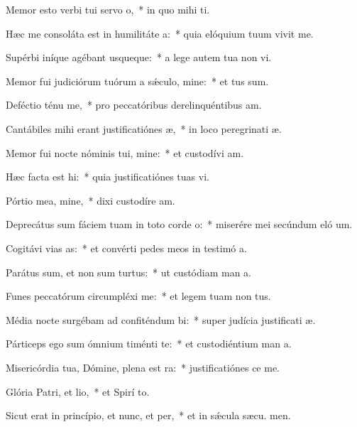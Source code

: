 \item Memor esto verbi tui servo o,~* in quo mihi  ti.
\item Hæc me consoláta est in humilitáte a:~* quia elóquium tuum vivit me.
\item Supérbi iníque agébant usqueque:~* a lege autem tua non vi.
\item Memor fui judiciórum tuórum a sǽculo, mine:~* et tus sum.
\item Deféctio ténu me,~* pro peccatóribus derelinquéntibus  am.
\item Cantábiles mihi erant justificatiónes æ,~* in loco peregrinati æ.
\item Memor fui nocte nóminis tui, mine:~* et custodívi  am.
\item Hæc facta est hi:~* quia justificatiónes tuas vi.
\item Pórtio mea, mine,~* dixi custodíre  am.
\item Deprecátus sum fáciem tuam in toto corde o:~* miserére mei secúndum eló um.
\item Cogitávi vias as:~* et convérti pedes meos in testimó a.
\item Parátus sum, et non sum turtus:~* ut custódiam man a.
\item Funes peccatórum circumpléxi  me:~* et legem tuam non  tus.
\item Média nocte surgébam ad confiténdum bi:~* super judícia justificati æ.
\item Párticeps ego sum ómnium timénti te:~* et custodiéntium man a.
\item Misericórdia tua, Dómine, plena est ra:~* justificatiónes  ce me.
\item Glória Patri, et lio,~* et Spirí to.
\item Sicut erat in princípio, et nunc, et per,~* et in sǽcula sæcu. men.

